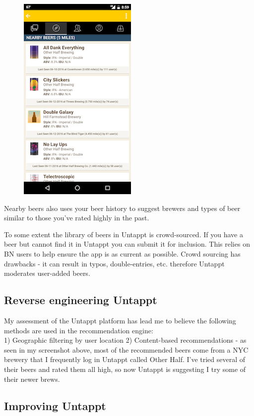 \documentclass[journal=jacsat,manuscript=article]{achemso}
\begin{document}
\begin{figure}[htbp]
\centering
\includegraphics{nearby_beers.png}
\caption{}
\end{figure}

Nearby beers also uses your beer history to suggest brewers and types of
beer similar to those you've rated highly in the past.

To some extent the library of beers in Untappt is crowd-sourced. If you
have a beer but cannot find it in Untappt you can submit it for
inclusion. This relies on BN users to help ensure the app is as current
as possible. Crowd sourcing has drawbacks - it can result in typos,
double-entries, etc. therefore Untappt moderates user-added beers.

\subsection{Reverse engineering
Untappt}\label{reverse-engineering-untappt}

My assessment of the Untappt platform has lead me to believe the
following methods are used in the recommendation engine:\\
1) Geographic filtering by user location 2) Content-based
recommendations - as seen in my screenshot above, most of the
recommended beers come from a NYC brewery that I frequently log in
Untappt called Other Half. I've tried several of their beers and rated
them all high, so now Untappt is suggesting I try some of their newer
brews.

\subsection{Improving Untappt}\label{improving-untappt}
\end{document}

